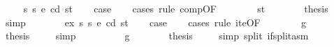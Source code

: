 \begin{isabellebody}
\isamarkupfalse%
\isanewline
\ \ \isamarkupfalse%
\ {\isacharparenleft}{\kern0pt}{}\ s{}\ s{}\ e\ cd\ st{\isacharparenright}{\kern0pt}\isanewline
\ \ \isamarkupfalse%
\ {\isacharquery}{\kern0pt}case\isanewline
\ \ \isamarkupfalse%
\ {\isacharparenleft}{\kern0pt}cases\ rule{\isacharcolon}{\kern0pt}\ comp{\isacharbrackleft}{\kern0pt}OF\ {}{\isacharparenleft}{\kern0pt}{}{\isacharparenright}{\kern0pt}{\isacharbrackright}{\kern0pt}{\isacharparenright}{\kern0pt}\isanewline
\ \ \ \ \isamarkupfalse%
\ {\isacharparenleft}{\kern0pt}{}\ st{\isacharprime}{\kern0pt}{\isacharprime}{\kern0pt}{\isacharparenright}{\kern0pt}\isanewline
\ \ \ \ \isamarkupfalse%
\ \isamarkupfalse%
\ {\isacharquery}{\kern0pt}thesis\ \isamarkupfalse%
\ {}\ \isamarkupfalse%
\ simp\isanewline
\ \ \isamarkupfalse%
\isanewline
{}\isamarkupfalse%
\isanewline
\ \ \isamarkupfalse%
\ {\isacharparenleft}{\kern0pt}{}\ ex\ s{}\ s{}\ e\ cd\ st{\isacharparenright}{\kern0pt}\isanewline
\ \ \isamarkupfalse%
\ {\isacharquery}{\kern0pt}case\isanewline
\ \ \isamarkupfalse%
\ {\isacharparenleft}{\kern0pt}cases\ rule{\isacharcolon}{\kern0pt}\ ite{\isacharbrackleft}{\kern0pt}OF\ {}{\isacharparenleft}{\kern0pt}{}{\isacharparenright}{\kern0pt}{\isacharbrackright}{\kern0pt}{\isacharparenright}{\kern0pt}\isanewline
\ \ \ \ \isamarkupfalse%
\ {\isacharparenleft}{\kern0pt}{}\ g{\isacharparenright}{\kern0pt}\isanewline
\ \ \ \ \isamarkupfalse%
\ \isamarkupfalse%
\ {\isacharquery}{\kern0pt}thesis\ \isamarkupfalse%
\ {}\ \isamarkupfalse%
\ simp\isanewline
\ \ \isamarkupfalse%
\isanewline
\ \ \ \ \isamarkupfalse%
\ {\isacharparenleft}{\kern0pt}{}\ g{\isacharparenright}{\kern0pt}\isanewline
\ \ \ \ \isamarkupfalse%
\ \isamarkupfalse%
\ {\isacharquery}{\kern0pt}thesis\ \isamarkupfalse%
\ {}\ \isamarkupfalse%
\ {\isacharparenleft}{\kern0pt}simp\ split{\isacharcolon}{\kern0pt}\ if{\isacharunderscore}{\kern0pt}split{\isacharunderscore}{\kern0pt}asm{\isacharparenright}{\kern0pt}\isanewline
\ \ \isamarkupfalse%
\isanewline

\end{isabellebody}
